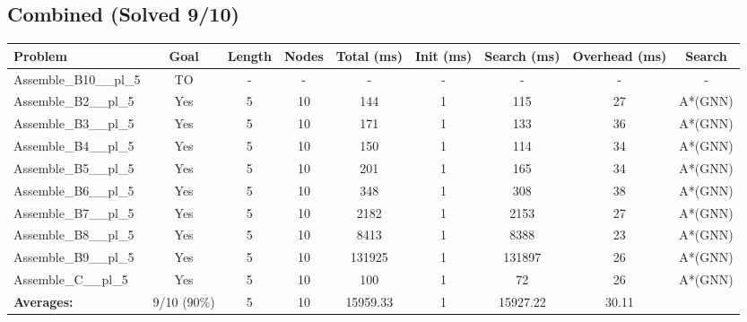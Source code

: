 \documentclass{article}
\begin{document}
\subsection*{Combined (Solved 9/10)}
\begin{tabular}{lcccccccc}
\toprule
Problem & Goal & Length & Nodes & Total (ms) & Init (ms) & Search (ms) & Overhead (ms) & Search \\
\midrule
Assemble\_B10\_\_pl\_5 & TO & - & - & - & - & - & - & - \\
Assemble\_B2\_\_pl\_5 & Yes & 5 & 10 & 144 & 1 & 115 & 27 & A*(GNN) \\
Assemble\_B3\_\_pl\_5 & Yes & 5 & 10 & 171 & 1 & 133 & 36 & A*(GNN) \\
Assemble\_B4\_\_pl\_5 & Yes & 5 & 10 & 150 & 1 & 114 & 34 & A*(GNN) \\
Assemble\_B5\_\_pl\_5 & Yes & 5 & 10 & 201 & 1 & 165 & 34 & A*(GNN) \\
Assemble\_B6\_\_pl\_5 & Yes & 5 & 10 & 348 & 1 & 308 & 38 & A*(GNN) \\
Assemble\_B7\_\_pl\_5 & Yes & 5 & 10 & 2182 & 1 & 2153 & 27 & A*(GNN) \\
Assemble\_B8\_\_pl\_5 & Yes & 5 & 10 & 8413 & 1 & 8388 & 23 & A*(GNN) \\
Assemble\_B9\_\_pl\_5 & Yes & 5 & 10 & 131925 & 1 & 131897 & 26 & A*(GNN) \\
Assemble\_C\_\_pl\_5 & Yes & 5 & 10 & 100 & 1 & 72 & 26 & A*(GNN) \\
\textbf{Averages:} & 9/10 (90\%) & 5 & 10 & 15959.33 & 1 & 15927.22 & 30.11 & \\
\bottomrule
\end{tabular}
\\[0.7cm]
\end{document}

